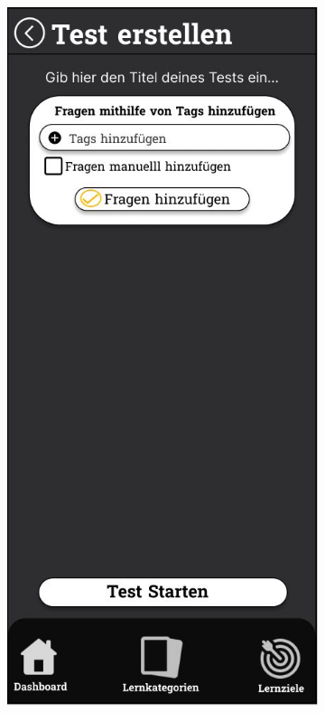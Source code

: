     \newpage

    \begin{figure}[htbp]
        \centering
        \begin{subfigure}[b]{0.45\linewidth}
          \centering
          \includegraphics[width=\linewidth]{images/Mockups/TestErstellen.JPG}

\end{subfigure}
\end{figure}
